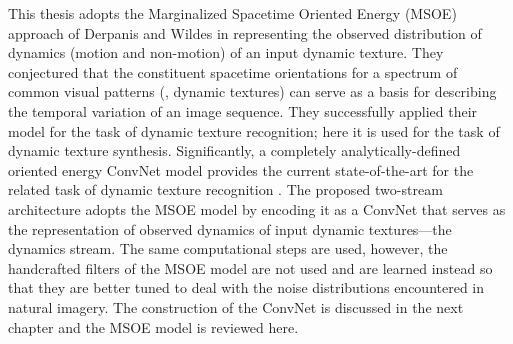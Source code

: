 This thesis adopts the Marginalized Spacetime Oriented Energy (MSOE) approach of Derpanis and Wildes \cite{derpanis2012spacetime} in representing the observed distribution of dynamics (\ie motion and non-motion) of an input dynamic texture. They conjectured that the constituent spacetime orientations for a spectrum of common
visual patterns (\eg, dynamic textures) can serve as a basis for describing the temporal
variation of an image sequence. They successfully applied their model for the task of dynamic texture recognition; here it is used for the task of dynamic texture synthesis. Significantly, a completely analytically-defined
oriented energy ConvNet model provides the current state-of-the-art
for the related task of dynamic texture recognition \cite{hadji2017}. The proposed two-stream architecture adopts the MSOE model by encoding it as a ConvNet that serves as the representation of observed dynamics of input dynamic textures---the dynamics stream. The same computational steps are used, however, the handcrafted filters of the MSOE model are not used and are learned instead so that they are better tuned to deal with the noise distributions encountered in natural imagery. The construction of the ConvNet is discussed in the next chapter and the MSOE model is reviewed here.

